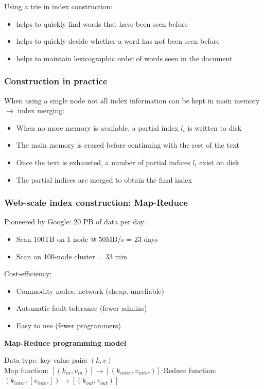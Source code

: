 Using a trie in index construction:
\begin{itemize}
\item helps to quickly find words that have been seen before
\item helps to quickly decide whether a word has not been seen before
\item helps to maintain lexicographic order of words seen in the
  document
\end{itemize}

\subsubsection{Construction in practice}
When using a single node not all index information can be kept in main
memory $ \rightarrow $ index merging:
\begin{itemize}
\item When no more memory is available, a partial index $ l_i $ is
  written to disk
\item The main memory is erased before continuing with the rest of the
  text
\item Once the text is exhausted, a number of partial indices $ l_i $
  exist on disk
\item The partial indices are merged to obtain the final index
\end{itemize}

\subsubsection{Web-scale index construction: Map-Reduce}

Pioneered by Google: 20 PB of data per day.
\begin{itemize}
\item Scan 100TB on 1 node @ 50MB/s = 23 days
\item Scan on 100-node cluster = 33 min
\end{itemize}

Cost-efficiency:
\begin{itemize}
\item Commodity nodes, network (cheap, unreliable)
\item Automatic fault-tolerance (fewer admins)
\item Easy to use (fewer programmers)
\end{itemize}

\textbf{Map-Reduce programming model}

Data type: key-value pairs $ (k, v) $ \\
Map function: $ [(k_{in}, v_{in})] \rightarrow [(k_{inter},
v_{inter})] $
Reduce function: $ (k_{inter}, [v_{inter}]) \rightarrow [(k_{out},
v_{out})] $

